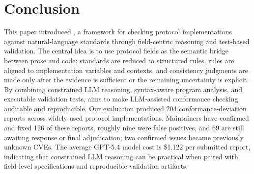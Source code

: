 \section{Conclusion}
\label{sec:conclusion}

This paper introduced \tool, a framework for checking protocol implementations
against natural-language standards through field-centric reasoning and
test-based validation. The central idea is to use protocol fields as the
semantic bridge between prose and code: standards are reduced to structured
 rules, rules are aligned to implementation variables and contexts,
and consistency judgments are made only after the evidence is sufficient or the
remaining uncertainty is explicit. By combining constrained LLM reasoning,
syntax-aware program analysis, and executable validation tests, \tool{} aims to
make LLM-assisted conformance checking auditable and reproducible. Our
evaluation produced 204 conformance-deviation reports across widely used
protocol implementations. Maintainers have confirmed and fixed 126 of these
reports, roughly nine were false positives, and 69 are still awaiting response
or final adjudication; two confirmed issues became previously unknown CVEs. The
average GPT-5.4 model cost is \$1.122 per submitted report, indicating that
constrained LLM reasoning can be practical when paired with field-level
specifications and reproducible validation artifacts.
